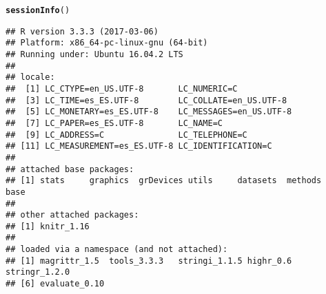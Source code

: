 \documentclass[12pt, a4paper]{article}\usepackage[]{graphicx}\usepackage[]{color}
\makeatletter
\newcommand{\hlstd}[1]{\textcolor[rgb]{0.345,0.345,0.345}{#1}}%
\newcommand{\hlkwd}[1]{\textcolor[rgb]{0.737,0.353,0.396}{\textbf{#1}}}%
\newenvironment{kframe}{%
 \def\at@end@of@kframe{}%
 \ifinner\ifhmode%
  \def\at@end@of@kframe{\end{minipage}}%
  \begin{minipage}{\columnwidth}%
 \fi\fi%
 \def\FrameCommand##1{\hskip\@totalleftmargin \hskip-\fboxsep
 \colorbox{shadecolor}{##1}\hskip-\fboxsep
     \hskip-\linewidth \hskip-\@totalleftmargin \hskip\columnwidth}%
 \MakeFramed {\advance\hsize-\width
   \@totalleftmargin\z@ \linewidth\hsize
   \@setminipage}}%
 {\par\unskip\endMakeFramed%
 \at@end@of@kframe}
\newenvironment{knitrout}{}{} %
\makeatother
\begin{document}
\begin{knitrout}
\color{fgcolor}\begin{kframe}
\begin{alltt}
\hlkwd{sessionInfo}\hlstd{()}
\end{alltt}
\begin{verbatim}
## R version 3.3.3 (2017-03-06)
## Platform: x86_64-pc-linux-gnu (64-bit)
## Running under: Ubuntu 16.04.2 LTS
## 
## locale:
##  [1] LC_CTYPE=en_US.UTF-8       LC_NUMERIC=C              
##  [3] LC_TIME=es_ES.UTF-8        LC_COLLATE=en_US.UTF-8    
##  [5] LC_MONETARY=es_ES.UTF-8    LC_MESSAGES=en_US.UTF-8   
##  [7] LC_PAPER=es_ES.UTF-8       LC_NAME=C                 
##  [9] LC_ADDRESS=C               LC_TELEPHONE=C            
## [11] LC_MEASUREMENT=es_ES.UTF-8 LC_IDENTIFICATION=C       
## 
## attached base packages:
## [1] stats     graphics  grDevices utils     datasets  methods   base     
## 
## other attached packages:
## [1] knitr_1.16
## 
## loaded via a namespace (and not attached):
## [1] magrittr_1.5  tools_3.3.3   stringi_1.1.5 highr_0.6     stringr_1.2.0
## [6] evaluate_0.10
\end{verbatim}
\end{kframe}
\end{knitrout}
\end{document}

